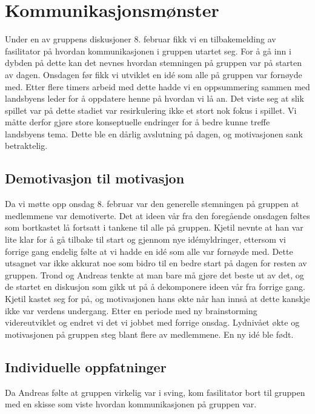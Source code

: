 
\section{Kommunikasjonsmønster} %
Under en av gruppens diskusjoner 8. februar fikk vi en tilbakemelding av fasilitator på hvordan kommunikasjonen i gruppen utartet seg. For å gå inn i dybden på dette kan det nevnes hvordan stemningen på gruppen var på starten av dagen. Onsdagen før fikk vi utviklet en idé som alle på gruppen var fornøyde med. Etter flere timers arbeid med dette hadde vi en oppsummering sammen med landsbyens leder for å oppdatere henne på hvordan vi lå an. Det viste seg at slik spillet var på dette stadiet var resirkulering ikke et stort nok fokus i spillet. Vi måtte derfor gjøre store konseptuelle endringer for å bedre kunne treffe landsbyens tema. Dette ble en dårlig avslutning på dagen, og motivasjonen sank betraktelig.

	\subsection{Demotivasjon til motivasjon}
	Da vi møtte opp onsdag 8. februar var den generelle stemningen på gruppen at medlemmene var demotiverte. Det at ideen vår fra den foregående onsdagen føltes som bortkastet lå fortsatt i tankene til alle på gruppen. Kjetil nevnte at han var lite klar for å gå tilbake til start og gjennom nye idémyldringer, ettersom vi forrige gang endelig følte at vi hadde en idé som alle var fornøyde med. Dette utsagnet var ikke akkurat noe som bidro til en bedre start på dagen for resten av gruppen. Trond og Andreas tenkte at man bare må gjøre det beste ut av det, og de startet en diskusjon som gikk ut på å dekomponere ideen vår fra forrige gang. Kjetil kastet seg for på, og motivasjonen hans økte når han innså at dette kanskje ikke var verdens undergang. Etter en periode med ny brainstorming videreutviklet og endret vi det vi jobbet med forrige onsdag. Lydnivået økte og motivasjonen på gruppen steg blant flere av medlemmene. En ny idé ble født.

	\subsection{Individuelle oppfatninger}
	Da Andreas følte at gruppen virkelig var i sving, kom fasilitator bort til gruppen med en skisse som viste hvordan kommunikasjonen på gruppen var.

